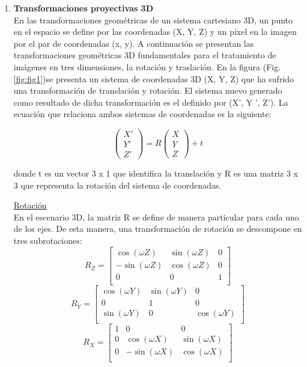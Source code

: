 \documentclass[a4,10pt]{article}
\begin{document}
\begin{enumerate}

\item \textbf{Transformaciones proyectivas 3D}\\
En las transformaciones geométricas de un sistema cartesiano 3D, un punto en el espacio se define por las coordenadas (X, Y, Z) y un pixel en la imagen por el par de coordenadas (x, y).
A continuación se presentan las transformaciones geométricas 3D fundamentales para el tratamiento de imágenes en tres dimensiones, la rotación y traslación. 
En la figura (Fig. \ref{fig:fig1})se presenta un sistema de coordenadas 3D (X, Y, Z) que ha sufrido una transformación de translación y rotación. El sistema nuevo generado como resultado de dicha transformación es el definido por (X’, Y ’, Z’). La ecuación que relaciona ambos sistemas de coordenadas es la siguiente: 

\begin{equation}
\begin{pmatrix}
X'\\
Y'\\
Z'
\end{pmatrix}
= R
\begin{pmatrix}
X\\
Y\\
Z
\end{pmatrix}
+ t
\end{equation}

donde t es un vector 3 x 1 que identifica la translación y R es una matriz 3 x 3 que representa la rotación del sistema de coordenadas.

\underline{Rotación}\\
En el escenario 3D, la matriz R se define de manera particular para cada uno de los ejes. De esta manera, una transformación de rotación se descompone en tres subrotaciones:\\
\begin{equation}
R_Z =
\begin{bmatrix}
\cos(\omega Z) & \sin(\omega Z) & 0\\
-\sin(\omega Z) & \cos(\omega Z) & 0\\
0 & 0 & 1\\
\end{bmatrix}
\end{equation}
\begin{equation}
R_Y =
\begin{bmatrix}
\cos(\omega Y) & \sin(\omega Y) & 0\\
0 & 1 & 0\\
\sin(\omega Y) & 0 & \cos(\omega Y)\\
\end{bmatrix}
\end{equation}
\begin{equation}
R_X =
\begin{bmatrix}
1 & 0 & 0\\
0 & \cos(\omega X) & \sin(\omega X)\\
0 & -\sin(\omega X) & \cos(\omega X)\\


\end{bmatrix}
\end{equation}
\end{enumerate}
\end{document}
